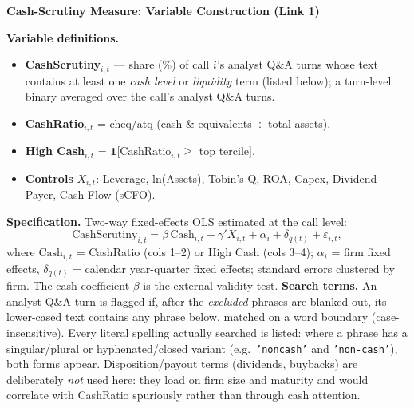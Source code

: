 \clearpage
\begin{center}\large\textbf{Cash-Scrutiny Measure: Variable Construction (Link 1)}\end{center}
\vspace{4pt}\noindent\textbf{Variable definitions.}
\begin{itemize}\setlength\itemsep{2pt}
\item \textbf{CashScrutiny}$_{i,t}$ --- share (\%) of call $i$'s analyst Q\&A turns whose text contains at least one \emph{cash level} or \emph{liquidity} term (listed below); a turn-level binary averaged over the call's analyst Q\&A turns.
\item \textbf{CashRatio}$_{i,t}$ = cheq/atq (cash \& equivalents $\div$ total assets).
\item \textbf{High Cash}$_{i,t}$ = $\mathbf{1}[\text{CashRatio}_{i,t}\geq$ top tercile$]$.
\item \textbf{Controls} $X_{i,t}$: Leverage, ln(Assets), Tobin's Q, ROA, Capex, Dividend Payer, Cash Flow (sCFO).
\end{itemize}
\vspace{2pt}\noindent\textbf{Specification.} Two-way fixed-effects OLS estimated at the call level:
\[ \text{CashScrutiny}_{i,t} = \beta\,\text{Cash}_{i,t} + \gamma' X_{i,t} + \alpha_i + \delta_{q(t)} + \varepsilon_{i,t}, \]
\noindent where $\text{Cash}_{i,t}$ = CashRatio (cols 1--2) or High Cash (cols 3--4); $\alpha_i$ = firm fixed effects, $\delta_{q(t)}$ = calendar year-quarter fixed effects; standard errors clustered by firm. The cash coefficient $\beta$ is the external-validity test.
\vspace{6pt}\noindent\textbf{Search terms.} An analyst Q\&A turn is flagged if, after the \emph{excluded} phrases are blanked out, its lower-cased text contains any phrase below, matched on a word boundary (case-insensitive). Every literal spelling actually searched is listed: where a phrase has a singular/plural or hyphenated/closed variant (e.g.\ \texttt{'noncash'} and \texttt{'non-cash'}), both forms appear. Disposition/payout terms (dividends, buybacks) are deliberately \emph{not} used here: they load on firm size and maturity and would correlate with CashRatio spuriously rather than through cash attention.

